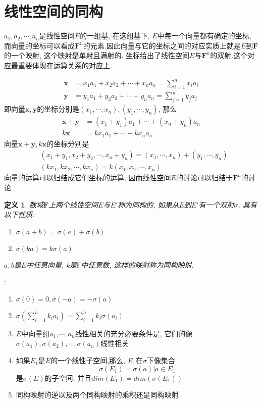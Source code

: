 \documentclass{book}
\newtheorem{definition}{\hspace{2em}定义}[section]
\begin{document}
\section{线性空间的同构}
$a_1,a_2,\cdots,a_n$是线性空间$E$的一组基, 在这组基下, $E$中每一个向量都有确定的坐标, 而向量的坐标可以看成$\mathbf{F}^n$的元素.因此向量与它的坐标之间的对应实质上就是$E$到$\mathbf{F}$的一个映射, 这个映射是单射且满射的. 坐标给出了线性空间$E$与$\mathbf{F}^n$的双射.这个对应最重要体现在运算关系的对应上.

\begin{equation*}
\begin{split}
   \mathbf{x}&=x_1a_1+x_2a_2+\cdots+x_na_n=\sum_{i=1}^{n}x_ia_i \\
   \mathbf{y}&=y_1a_1+y_2a_2+\cdots+y_na_n=\sum_{j=1}^{n}y_ja_j
\end{split}
\end{equation*}
即向量$\mathbf{x},\mathbf{y}$的坐标分别是$(x_1,\cdots,x_n),(y_1,\cdots,y_n)$, 那么
\begin{equation*}
\begin{split}
  \mathbf{x}+\mathbf{y}&=(x_1+y_1)a_1+\cdots+(x_n+y_n)a_n\\
  k\mathbf{x}&=kx_1a_1+\cdots+kx_na_n
\end{split}
\end{equation*}
向量$\mathbf{x}+\mathbf{y},k\mathbf{x}$的坐标分别是
\begin{equation*}
\begin{split}
  &(x_1+y_1,x_2+y_2,\cdots,x_n+y_n)=(x_1,\cdots,x_n)+(y_1,\cdots,y_n)\\
  &(kx_1,kx_2,\cdots,kx_n)=k(x_1,x_2,\cdots,x_n)
\end{split}
\end{equation*}
向量的运算可以归结成它们坐标的运算, 因而线性空间$E$的讨论可以归结于$\mathbf{F}^n$的讨论
\begin{definition}
  数域$\mathbf{F}$上两个线性空间$E$与$E'$称为同构的, 如果从$E$到$E'$有一个双射$\sigma$. 具有以下性质:
  \begin{enumerate}[(1)]
    \item $\sigma(a+b)=\sigma(a)+\sigma(b)$
    \item $\sigma(ka)=k\sigma(a)$
  \end{enumerate}
  $a,b$是$E$中任意向量, k是$\mathbb{F}$中任意数, 这样的映射称为同构映射.
\end{definition}
:
\begin{enumerate}[(1)]
  \item $\sigma(0)=0,\sigma(-a)=-\sigma(a)$
  \item $\sigma(\sum_{i=1}^{n}k_ia_i)=\sum_{i=1}^{n}k_i\sigma(a_i)$
  \item $E$中向量组$a_1,\cdots,a_n$线性相关的充分必要条件是, 它们的像$\sigma(a_1),\sigma(a_2),\cdots,\sigma(a_n)$线性相关
  \item 如果$E_1$是$E$的一个线性子空间,那么, $E_1$在$\sigma$下像集合
  \begin{equation*}
    \sigma(E_1)={\sigma(a)|a\in E_1}
  \end{equation*}
  是$\sigma(E)$的子空间, 并且$dim(E_1)=dim(\sigma(E_1))$
  \item 同构映射的逆以及两个同构映射的乘积还是同构映射
\end{enumerate}
\end{document}
